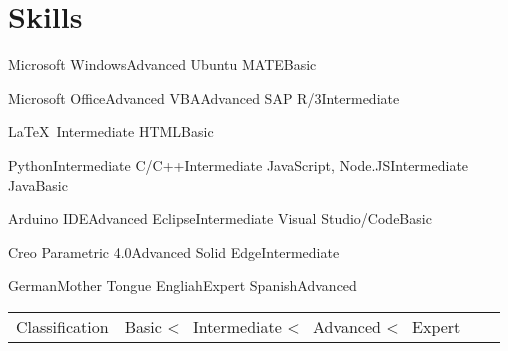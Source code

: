 
\section*{Skills}
\medskip





	{Microsoft Windows}{Advanced}
	{Ubuntu MATE}{Basic}
	{}{}
	{}{}



%
	{Microsoft Office}{Advanced}
	{VBA}{Advanced}
	{SAP R/3}{Intermediate}
	{}{}
	

%
	{\LaTeX\ }{Intermediate}
	{HTML}{Basic}
	{}{}
	{}{}
	

%
	{Python}{Intermediate}	
	{C/C++}{Intermediate}
	{JavaScript, Node.JS}{Intermediate}
	{Java}{Basic}



{Arduino IDE}{Advanced}	
{Eclipse}{Intermediate}
{Visual Studio/Code}{Basic}
{}{}


	{}{}
	{}{}
	{}{}
	
	
	{Creo Parametric 4.0}{Advanced}
	{Solid Edge}{Intermediate}
	{}{}
	{}{}


	{German}{Mother Tongue}
	{Engliah}{Expert}
	{Spanish}{Advanced}
	{}{}
	
	
	

\noindent
\begin{tabular*}{\textwidth}{@{}R{6cm}|lll}
	\noindent
	{\small Classification}	&	{\small Basic \textless~ Intermediate \textless~ Advanced \textless~ Expert}
\end{tabular*}
